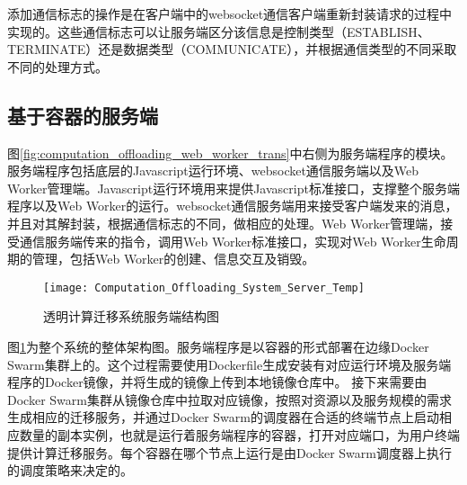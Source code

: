 添加通信标志的操作是在客户端中的websocket通信客户端重新封装请求的过程中实现的。这些通信标志可以让服务端区分该信息是控制类型（ESTABLISH、TERMINATE）还是数据类型（COMMUNICATE），并根据通信类型的不同采取不同的处理方式。

\subsection{基于容器的服务端}

图\ref{fig:computation_offloading_web_worker_trans}中右侧为服务端程序的模块。服务端程序包括底层的Javascript运行环境、websocket通信服务端以及Web Worker管理端。Javascript运行环境用来提供Javascript标准接口，支撑整个服务端程序以及Web Worker的运行。websocket通信服务端用来接受客户端发来的消息，并且对其解封装，根据通信标志的不同，做相应的处理。Web Worker管理端，接受通信服务端传来的指令，调用Web Worker标准接口，实现对Web Worker生命周期的管理，包括Web Worker的创建、信息交互及销毁。

\begin{figure}[!htbp]
    \centering
    \texttt{[image: Computation\_Offloading\_System\_Server\_Temp]}
    \caption{透明计算迁移系统服务端结构图}
    \label{fig:computation_offloading_system_server}
\end{figure}

图\ref{fig:computation_offloading_system_server}为整个系统的整体架构图。服务端程序是以容器的形式部署在边缘Docker Swarm集群上的。这个过程需要使用Dockerfile生成安装有对应运行环境及服务端程序的Docker镜像，并将生成的镜像上传到本地镜像仓库中。
接下来需要由Docker Swarm集群从镜像仓库中拉取对应镜像，按照对资源以及服务规模的需求生成相应的迁移服务，并通过Docker Swarm的调度器在合适的终端节点上启动相应数量的副本实例，也就是运行着服务端程序的容器，打开对应端口，为用户终端提供计算迁移服务。每个容器在哪个节点上运行是由Docker Swarm调度器上执行的调度策略来决定的。

